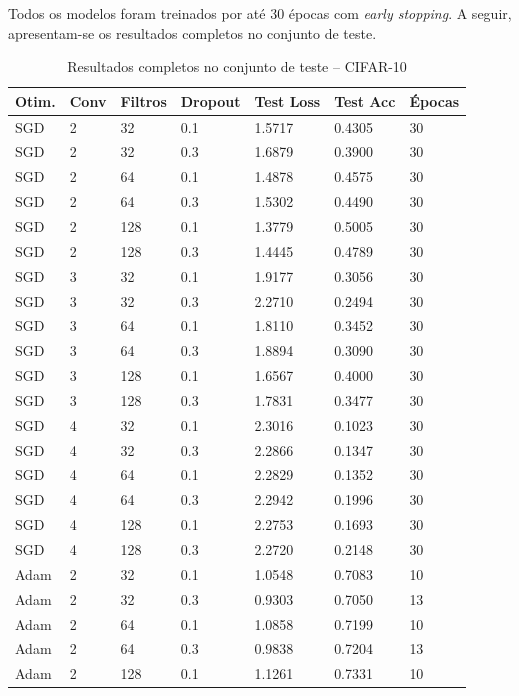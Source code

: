 \documentclass[12pt,a4paper]{article}
\begin{document}
Todos os modelos foram treinados por até 30 épocas com \textit{early stopping}. A seguir, apresentam-se os resultados completos no conjunto de teste.

\begin{table}[H]
\centering
\caption{Resultados completos no conjunto de teste -- CIFAR-10}
\label{tab:full_results}
\scriptsize
\setlength{\tabcolsep}{4pt}
\begin{tabular}{lllllll}
\toprule
\textbf{Otim.} & \textbf{Conv} & \textbf{Filtros} & \textbf{Dropout} & \textbf{Test Loss} & \textbf{Test Acc} & \textbf{Épocas} \\
\midrule
SGD & 2 & 32  & 0.1 & 1.5717 & 0.4305 & 30 \\
SGD & 2 & 32  & 0.3 & 1.6879 & 0.3900 & 30 \\
SGD & 2 & 64  & 0.1 & 1.4878 & 0.4575 & 30 \\
SGD & 2 & 64  & 0.3 & 1.5302 & 0.4490 & 30 \\
SGD & 2 & 128 & 0.1 & 1.3779 & 0.5005 & 30 \\
SGD & 2 & 128 & 0.3 & 1.4445 & 0.4789 & 30 \\
SGD & 3 & 32  & 0.1 & 1.9177 & 0.3056 & 30 \\
SGD & 3 & 32  & 0.3 & 2.2710 & 0.2494 & 30 \\
SGD & 3 & 64  & 0.1 & 1.8110 & 0.3452 & 30 \\
SGD & 3 & 64  & 0.3 & 1.8894 & 0.3090 & 30 \\
SGD & 3 & 128 & 0.1 & 1.6567 & 0.4000 & 30 \\
SGD & 3 & 128 & 0.3 & 1.7831 & 0.3477 & 30 \\
SGD & 4 & 32  & 0.1 & 2.3016 & 0.1023 & 30 \\
SGD & 4 & 32  & 0.3 & 2.2866 & 0.1347 & 30 \\
SGD & 4 & 64  & 0.1 & 2.2829 & 0.1352 & 30 \\
SGD & 4 & 64  & 0.3 & 2.2942 & 0.1996 & 30 \\
SGD & 4 & 128 & 0.1 & 2.2753 & 0.1693 & 30 \\
SGD & 4 & 128 & 0.3 & 2.2720 & 0.2148 & 30 \\
\midrule
Adam & 2 & 32  & 0.1 & 1.0548 & 0.7083 & 10 \\
Adam & 2 & 32  & 0.3 & 0.9303 & 0.7050 & 13 \\
Adam & 2 & 64  & 0.1 & 1.0858 & 0.7199 & 10 \\
Adam & 2 & 64  & 0.3 & 0.9838 & 0.7204 & 13 \\
Adam & 2 & 128 & 0.1 & 1.1261 & 0.7331 & 10 \\

\end{tabular}
\end{table}
\end{document}
